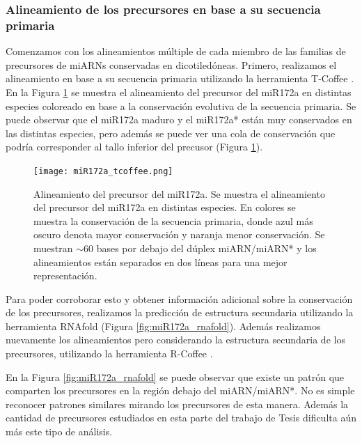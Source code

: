 \subsubsection{Alineamiento de los precursores en base a su secuencia primaria}

Comenzamos con los alineamientos múltiple de cada miembro de las familias de precursores de miARNs conservadas en dicotiledóneas.
Primero, realizamos el alineamiento en base a su secuencia primaria utilizando la herramienta T-Coffee \citep{pmid10964570}.
En la Figura \ref{fig:miR172a_tcoffee} se muestra el alineamiento del precursor del miR172a en distintas especies coloreado en base a la conservación evolutiva de la secuencia primaria.
Se puede observar que el miR172a maduro y el miR172a* están muy conservados en las distintas especies, pero además se puede ver una cola de conservación que podría corresponder al tallo inferior del precusor (Figura \ref{fig:miR172a_tcoffee}).

\begin{landscape}
    \begin{figure}[htbp!] 
        \centering    
        \texttt{[image: miR172a\_tcoffee.png]}
        \caption[Alineamiento del precursor del miR172a.]{Alineamiento del precursor del miR172a. 
        Se muestra el alineamiento del precursor del miR172a en distintas especies. 
        En colores se muestra la conservación de la secuencia primaria, donde azul más oscuro denota mayor conservación y naranja menor conservación.
        Se muestran $\sim$60 bases por debajo del dúplex miARN/miARN* y los alineamientos están separados en dos líneas para una mejor representación.}
         \label{fig:miR172a_tcoffee}
    \end{figure}
\end{landscape}

Para poder corroborar esto y obtener información adicional sobre la conservación de los precursores, realizamos la predicción de estructura secundaria utilizando la herramienta RNAfold \citep{pmid22115189} (Figura \ref{fig:miR172a_rnafold}).
Además realizamos nuevamente los alineamientos pero considerando la estructura secundaria de los precursores, utilizando la herramienta R-Coffee \citep{pmid18292307}.

En la Figura \ref{fig:miR172a_rnafold} se puede observar que existe un patrón que comparten los precursores en la región debajo del miARN/miARN*.
No es simple reconocer patrones similares mirando los precursores de esta manera.
Además la cantidad de precursores estudiados en esta parte del trabajo de Tesis dificulta aún más este tipo de análisis.

